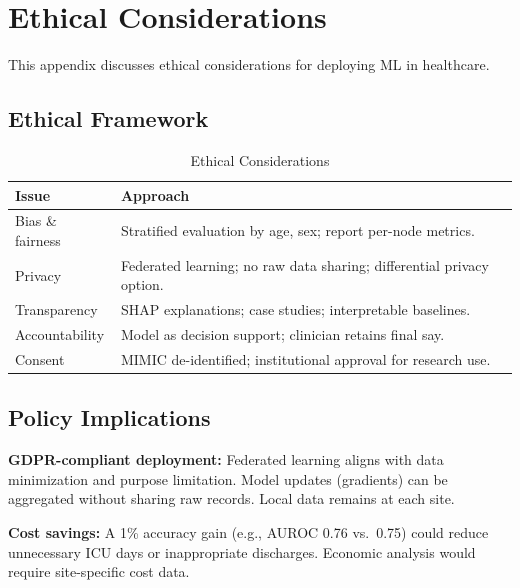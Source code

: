 \chapter{Ethical Considerations}
\label{app:ethics}

This appendix discusses ethical considerations for deploying ML in healthcare.

\section{Ethical Framework}

\begin{table}[h]
\centering
\caption{Ethical Considerations}
\begin{tabular}{ll}
\toprule
Issue & Approach \\
\midrule
Bias \& fairness & Stratified evaluation by age, sex; report per-node metrics. \\
Privacy & Federated learning; no raw data sharing; differential privacy option. \\
Transparency & SHAP explanations; case studies; interpretable baselines. \\
Accountability & Model as decision support; clinician retains final say. \\
Consent & MIMIC de-identified; institutional approval for research use. \\
\bottomrule
\end{tabular}
\label{tab:ethics_full}
\end{table}

\section{Policy Implications}

\textbf{GDPR-compliant deployment:} Federated learning aligns with data minimization and purpose limitation. Model updates (gradients) can be aggregated without sharing raw records. Local data remains at each site.

\textbf{Cost savings:} A 1\% accuracy gain (e.g., AUROC 0.76 vs.\ 0.75) could reduce unnecessary ICU days or inappropriate discharges. Economic analysis would require site-specific cost data.

